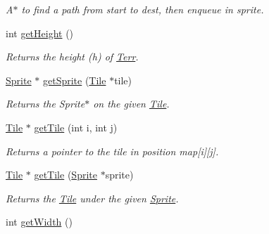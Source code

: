 \begin{DoxyCompactItemize}
\begin{DoxyCompactList}\small\item\em A$\ast$ to find a path from start to dest, then enqueue in sprite. \end{DoxyCompactList}\item 
int \hyperlink{class_terr_a0ef7c8147e12a2291fc84d9ebc67a8df}{get\+Height} ()\hypertarget{class_terr_a0ef7c8147e12a2291fc84d9ebc67a8df}{}\label{class_terr_a0ef7c8147e12a2291fc84d9ebc67a8df}

\begin{DoxyCompactList}\small\item\em Returns the height (h) of \hyperlink{class_terr}{Terr}. \end{DoxyCompactList}\item 
\hyperlink{class_sprite}{Sprite} $\ast$ \hyperlink{class_terr_a556536114490c30cfa5b8c51bcd5c4a0}{get\+Sprite} (\hyperlink{class_tile}{Tile} $\ast$tile)\hypertarget{class_terr_a556536114490c30cfa5b8c51bcd5c4a0}{}\label{class_terr_a556536114490c30cfa5b8c51bcd5c4a0}

\begin{DoxyCompactList}\small\item\em Returns the Sprite$\ast$ on the given \hyperlink{class_tile}{Tile}. \end{DoxyCompactList}\item 
\hyperlink{class_tile}{Tile} $\ast$ \hyperlink{class_terr_a1ca3548cb10880ae8ac01362d1f3116a}{get\+Tile} (int i, int j)\hypertarget{class_terr_a1ca3548cb10880ae8ac01362d1f3116a}{}\label{class_terr_a1ca3548cb10880ae8ac01362d1f3116a}

\begin{DoxyCompactList}\small\item\em Returns a pointer to the tile in position map\mbox{[}i\mbox{]}\mbox{[}j\mbox{]}. \end{DoxyCompactList}\item 
\hyperlink{class_tile}{Tile} $\ast$ \hyperlink{class_terr_a31e8adf3ea4f593e0add333c3160942f}{get\+Tile} (\hyperlink{class_sprite}{Sprite} $\ast$sprite)\hypertarget{class_terr_a31e8adf3ea4f593e0add333c3160942f}{}\label{class_terr_a31e8adf3ea4f593e0add333c3160942f}

\begin{DoxyCompactList}\small\item\em Returns the \hyperlink{class_tile}{Tile} under the given \hyperlink{class_sprite}{Sprite}. \end{DoxyCompactList}\item 
int \hyperlink{class_terr_a397fdbbeb3fe3eb8989d9da77af42f57}{get\+Width} ()\hypertarget{class_terr_a397fdbbeb3fe3eb8989d9da77af42f57}{}\label{class_terr_a397fdbbeb3fe3eb8989d9da77af42f57}


\end{DoxyCompactItemize}
